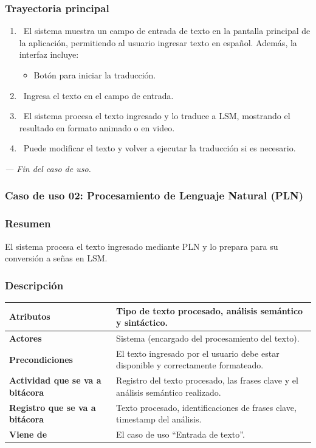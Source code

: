 \subsubsection{Trayectoria principal}
\begin{enumerate}[label=\textbf{\arabic*}, leftmargin=1.5cm]
    \item \UCsystem \ El sistema muestra un campo de entrada de texto en la pantalla principal de la aplicación, permitiendo al usuario ingresar texto en español.  
    Además, la interfaz incluye:  
    \begin{itemize}
        \item Botón para iniciar la traducción.
    \end{itemize}

    \item \UCactor \ Ingresa el texto en el campo de entrada.  
   
    \item \UCsystem \ El sistema procesa el texto ingresado y lo traduce a LSM, mostrando el resultado en formato animado o en video.

    \item \UCactor \ Puede modificar el texto y volver a ejecutar la traducción si es necesario.

\end{enumerate}

\textit{--- Fin del caso de uso.}

\subsubsection{Caso de uso 02: Procesamiento de Lenguaje Natural (PLN)}
\subsubsection{Resumen}
El sistema procesa el texto ingresado mediante PLN y lo prepara para su conversión a señas en LSM.
\subsubsection{Descripción}
\noindent
\begin{tabularx}{\textwidth}{|l|X|}
\hline
\textbf{Atributos} & Tipo de texto procesado, análisis semántico y sintáctico. \\ \hline
\textbf{Actores} & Sistema (encargado del procesamiento del texto). \\ \hline
\textbf{Precondiciones} & El texto ingresado por el usuario debe estar disponible y correctamente formateado. \\ \hline
\textbf{Actividad que se va a bitácora} & Registro del texto procesado, las frases clave y el análisis semántico realizado. \\ \hline
\textbf{Registro que se va a bitácora} & Texto procesado, identificaciones de frases clave, timestamp del análisis. \\ \hline
\textbf{Viene de} & El caso de uso “Entrada de texto”. \\ \hline
\end{tabularx}
    
